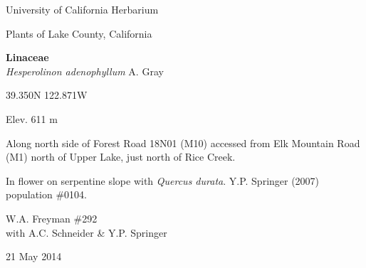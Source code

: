 \documentclass[letterpaper,10pt]{article}
\begin{document}
\begin{minipage}[t]{0.40\textwidth}

\begin{center}
University of California Herbarium \\
\begin{large}
Plants of Lake County, California \\
\end{large}
\vspace{\baselineskip}
\textbf{Linaceae} \\
\textit{Hesperolinon adenophyllum} A. Gray\\
\end{center}

\begin{footnotesize}

\begin{multicols}{2}
39.350\textdegree N 122.871\textdegree W
\columnbreak
\begin{flushright}
Elev. 611 m
\end{flushright}
\end{multicols}

Along north side of Forest Road 18N01 (M10) accessed from Elk Mountain Road (M1) north of Upper Lake, just north of Rice Creek.
\vspace{\baselineskip}

In flower on serpentine slope with \textit{Quercus durata}. Y.P. Springer (2007) population \#0104.

\begin{multicols}{2}
W.A. Freyman \#292 \\
with A.C. Schneider \& Y.P. Springer
\columnbreak
\begin{flushright}
21 May 2014
\end{flushright}
\end{multicols}

\end{footnotesize}

\end{minipage}
%
\hspace{2cm}
%
\end{document}
